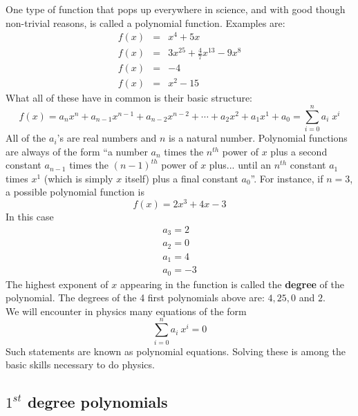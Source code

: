 \noindent One type of function that pops up everywhere in science, and with good though non-trivial reasons, is called a polynomial function. Examples are:
\begin{eqnarray*}
 f(x) & = & x^4 +5x \\
f(x) & = & 3x^{25} + \frac{4}{7}x^{13} - 9x^8 \\
f(x) & = & -4 \\
f(x) & = & x^2 - 15
\end{eqnarray*}
\noindent What all of these have in common is their basic structure:
\begin{equation}
\label{Def_Polynom}
f(x) = a_n x^n + a_{n-1} x^{n-1} + a_{n-2} x^{n-2} + \cdots + a_2 x^2 + a_1 x^1 + a_0 = \sum\limits_{i=0}^{n} a_i \; x^{i}
\end{equation}
All of the $a_i$'s are real numbers and $n$ is a natural number. Polynomial functions are always of the form "`a number $a_n$ times the $n^{th}$ power of $x$ plus a second constant $a_{n-1}$ times the $(n-1)^{th}$ power of $x$ plus... until an $n^{th}$ constant $a_1$ times $x^1$ (which is simply $x$ itself) plus a final constant $a_0$"'. For instance, if $n=3$, a possible polynomial function is 
$$
f(x) = 2 x^3 + 4x -3
$$ 
\noindent In this case
\begin{eqnarray*}
a_3 = 2 \\
a_2 = 0 \\
a_1 = 4 \\
a_0 = -3
\end{eqnarray*}
The highest exponent of $x$ appearing in the function is called the \textbf{degree} of the polynomial. The degrees of the 4 first polynomials above are: $4, 25, 0$ and $2$.\\

\noindent We will encounter in physics many equations of the form
\begin{equation}
\sum\limits_{i=0}^{n} a_i \: x^{i} = 0
\end{equation}
Such statements are known as polynomial equations. Solving these is among the basic skills necessary to do physics.

\subsection{$1^{st}$ degree polynomials}

